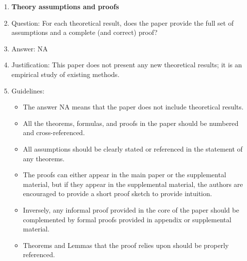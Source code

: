 \documentclass{article}
\newcommand{\answerNA}[1][]{NA}
\begin{document}
\begin{enumerate}
\item {\bf Theory assumptions and proofs}
    \item[] Question: For each theoretical result, does the paper provide the full set of assumptions and a complete (and correct) proof?
    \item[] Answer: \answerNA{}
    \item[] Justification: This paper does not present any new theoretical results; it is an empirical study of existing methods.
    \item[] Guidelines:
    \begin{itemize}
        \item The answer NA means that the paper does not include theoretical results. 
        \item All the theorems, formulas, and proofs in the paper should be numbered and cross-referenced.
        \item All assumptions should be clearly stated or referenced in the statement of any theorems.
        \item The proofs can either appear in the main paper or the supplemental material, but if they appear in the supplemental material, the authors are encouraged to provide a short proof sketch to provide intuition. 
        \item Inversely, any informal proof provided in the core of the paper should be complemented by formal proofs provided in appendix or supplemental material.
        \item Theorems and Lemmas that the proof relies upon should be properly referenced. 
    \end{itemize}


\end{enumerate}
\end{document}
